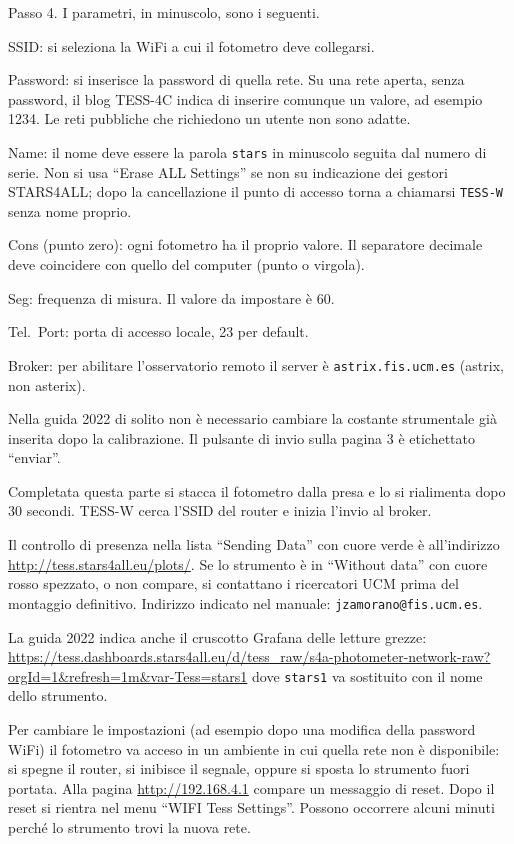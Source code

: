 \documentclass[11pt,a4paper]{report}
\begin{document}
Passo 4. I parametri, in minuscolo, sono i seguenti.

SSID: si seleziona la WiFi a cui il fotometro deve collegarsi.

Password: si inserisce la password di quella rete. Su una rete aperta, senza password, il blog TESS-4C indica di inserire comunque un valore, ad esempio 1234. Le reti pubbliche che richiedono un utente non sono adatte.

Name: il nome deve essere la parola \texttt{stars} in minuscolo seguita dal numero di serie. Non si usa ``Erase ALL Settings'' se non su indicazione dei gestori STARS4ALL; dopo la cancellazione il punto di accesso torna a chiamarsi \texttt{TESS-W} senza nome proprio.

Cons (punto zero): ogni fotometro ha il proprio valore. Il separatore decimale deve coincidere con quello del computer (punto o virgola).

Seg: frequenza di misura. Il valore da impostare è 60.

Tel.\ Port: porta di accesso locale, 23 per default.

Broker: per abilitare l'osservatorio remoto il server è \texttt{astrix.fis.ucm.es} (astrix, non asterix).

Nella guida 2022 di solito non è necessario cambiare la costante strumentale già inserita dopo la calibrazione. Il pulsante di invio sulla pagina 3 è etichettato ``enviar''.

Completata questa parte si stacca il fotometro dalla presa e lo si rialimenta dopo 30 secondi. TESS-W cerca l'SSID del router e inizia l'invio al broker.

Il controllo di presenza nella lista ``Sending Data'' con cuore verde è all'indirizzo \url{http://tess.stars4all.eu/plots/}. Se lo strumento è in ``Without data'' con cuore rosso spezzato, o non compare, si contattano i ricercatori UCM prima del montaggio definitivo. Indirizzo indicato nel manuale: \texttt{jzamorano@fis.ucm.es}.

La guida 2022 indica anche il cruscotto Grafana delle letture grezze:
\url{https://tess.dashboards.stars4all.eu/d/tess_raw/s4a-photometer-network-raw?orgId=1&refresh=1m&var-Tess=stars1}
dove \texttt{stars1} va sostituito con il nome dello strumento.

Per cambiare le impostazioni (ad esempio dopo una modifica della password WiFi) il fotometro va acceso in un ambiente in cui quella rete non è disponibile: si spegne il router, si inibisce il segnale, oppure si sposta lo strumento fuori portata. Alla pagina \url{http://192.168.4.1} compare un messaggio di reset. Dopo il reset si rientra nel menu ``WIFI Tess Settings''. Possono occorrere alcuni minuti perché lo strumento trovi la nuova rete.
\end{document}
